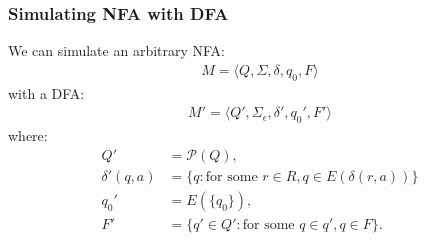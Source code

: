 \subsubsection{Simulating NFA with DFA}

We can simulate an arbitrary NFA: \begin{gather*}
    M =  \langle Q, \Sigma, \delta, q_0, F \rangle
\end{gather*}
with a DFA: \begin{gather*}
    M' = \langle Q', \Sigma_\epsilon, \delta', q_0', F' \rangle
\end{gather*} where: \begin{align*}
    Q'   &= \mathcal{P}(Q), \\
    \delta'(q, a) &= \{q : \text{for some }
        r \in R, q \in E(\delta(r, a))
    \} \\
    q_0' &= E(\{q_0\}), \\
    F'   &= \{q' \in Q' : \text{for some } q \in q', q \in F\}.
\end{align*}
